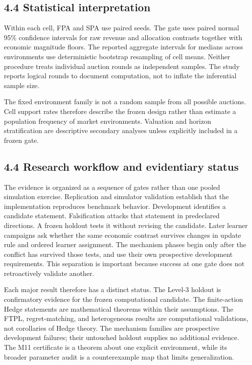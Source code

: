 \documentclass[11pt]{article}
\begin{document}
\subsection{4.4 Statistical interpretation}
Within each cell, FPA and SPA use paired seeds. The gate uses paired normal 95\% confidence intervals for raw revenue and allocation contrasts together with economic magnitude floors. The reported aggregate intervals for medians across environments use deterministic bootstrap resampling of cell means. Neither procedure treats individual auction rounds as independent samples. The study reports logical rounds to document computation, not to inflate the inferential sample size.

The fixed environment family is not a random sample from all possible auctions. Cell support rates therefore describe the frozen design rather than estimate a population frequency of market environments. Valuation and horizon stratification are descriptive secondary analyses unless explicitly included in a frozen gate.

\subsection{4.4 Research workflow and evidentiary status}
The evidence is organized as a sequence of gates rather than one pooled simulation exercise. Replication and simulator validation establish that the implementation reproduces benchmark behavior. Development identifies a candidate statement. Falsification attacks that statement in predeclared directions. A frozen holdout tests it without revising the candidate. Later learner campaigns ask whether the same economic contrast survives changes in update rule and ordered learner assignment. The mechanism phases begin only after the conflict has survived those tests, and use their own prospective development requirements. This separation is important because success at one gate does not retroactively validate another.

Each major result therefore has a distinct status. The Level-3 holdout is confirmatory evidence for the frozen computational candidate. The finite-action Hedge statements are mathematical theorems within their assumptions. The FTPL, regret-matching, and heterogeneous results are computational validations, not corollaries of Hedge theory. The mechanism families are prospective development failures; their untouched holdout supplies no additional evidence. The M11 certificate is a theorem about one explicit environment, while its broader parameter audit is a counterexample map that limits generalization.
\end{document}
